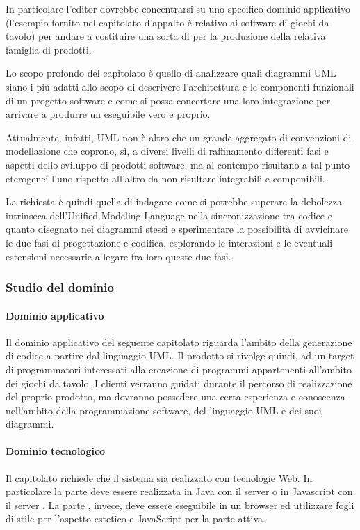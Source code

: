 		In particolare l'editor dovrebbe concentrarsi su uno specifico dominio applicativo (l'esempio fornito nel capitolato d'appalto è relativo ai software di giochi da tavolo) per andare a costituire una sorta di  per la produzione della relativa famiglia di prodotti.

		Lo scopo profondo del capitolato è quello di analizzare quali diagrammi UML siano i più adatti allo scopo di descrivere l'architettura 
		e le componenti funzionali di un progetto software e come si possa concertare una loro integrazione per arrivare a produrre un eseguibile vero e proprio. 

		Attualmente, infatti, UML non è altro che un grande aggregato di convenzioni di modellazione che coprono, sì, a diversi livelli di raffinamento differenti fasi e aspetti dello sviluppo di prodotti software, ma al contempo risultano a tal punto eterogenei l'uno rispetto all'altro da non risultare integrabili e componibili. 

		La richiesta è quindi quella di indagare come si potrebbe superare la debolezza intrinseca dell'Unified Modeling Language nella sincronizzazione tra codice e quanto disegnato nei diagrammi stessi e sperimentare la possibilità di avvicinare le due fasi di progettazione e codifica, esplorando le interazioni e le eventuali estensioni necessarie a legare fra loro queste due fasi.
		\subsubsection{Studio del dominio}
			\paragraph{Dominio applicativo} Il dominio applicativo del seguente capitolato riguarda l'ambito della generazione di codice a partire dal linguaggio UML. Il prodotto si rivolge quindi, ad un target di programmatori interessati alla creazione di programmi appartenenti all'ambito dei giochi da tavolo. I clienti verranno guidati durante il percorso di realizzazione del proprio prodotto, ma dovranno possedere una certa esperienza e conoscenza nell'ambito della programmazione software, del linguaggio UML e dei suoi diagrammi.
			
			\paragraph{Dominio tecnologico}
			Il capitolato richiede che il sistema sia realizzato con tecnologie Web. In particolare la parte  deve essere realizzata in Java con il server 
			 o in Javascript con il server . La parte , invece, deve essere eseguibile in un browser  ed utilizzare fogli di stile  per 
			l'aspetto estetico e JavaScript per la parte attiva.
		
